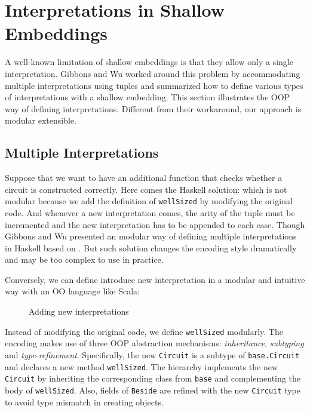 \section{Interpretations in Shallow Embeddings}

\begin{comment}
Weixin writes this one.

Go over jeremy's examples, maybe having only 3 diagram 
constructs instead of 5 for space reasons.

Use five constructs to show extensibility.

Think of how to introduce our tool? Using the Jeremy's examples? 
or introducing before with some other examples?

\end{comment}

A well-known limitation of shallow embeddings is that they allow only a single
interpretation. Gibbons and Wu worked around this problem by accommodating
multiple interpretations using tuples and summarized how to define various types
of interpretations with a shallow embedding.
This section illustrates the OOP way of defining interpretations. Different from
their workaround, our approach is modular extensible.

\subsection{Multiple Interpretations}
Suppose that we want to have an additional function that checks whether a circuit is
constructed correctly. Here comes the Haskell solution:
which is not modular because we add the definition of \lstinline{wellSized} by
modifying the original code. And whenever a new interpretation comes,
the arity of the tuple must be incremented and the new interpretation has to be
appended to each case.
Though Gibbons and Wu presented an modular way of defining multiple
interpretations in Haskell based on
\cite{swierstra2008data}. But such solution changes the encoding style
dramatically and may be too complex to use in practice.

Conversely, we can define introduce new interpretation in a
modular and intuitive way with an OO language like Scala:
\begin{figure}
\caption{Adding new interpretations}
\label{code:operation}
\end{figure}
Instead of modifying the original code, we define \lstinline{wellSized} modularly.
The encoding makes use of three OOP abstraction mechanisms:
\emph{inheritance}, \emph{subtyping} and \emph{type-refinement}.
Specifically, the new \lstinline{Circuit} is a subtype of
\lstinline{base.Circuit} and declares a new method \lstinline{wellSized}.
The hierarchy implements the new \lstinline{Circuit} by inheriting the corresponding class
from \lstinline{base} and
complementing the body of \lstinline{wellSized}.
Also, fields of \lstinline{Beside} are refined with the new \lstinline{Circuit}
type to avoid type mismatch in creating objects.


